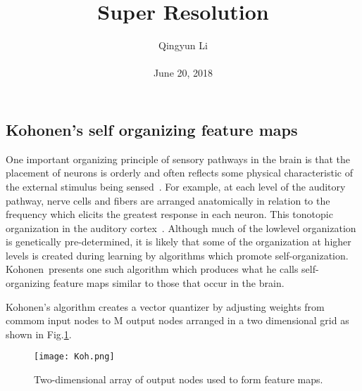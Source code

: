\documentclass[10pt,twocolumn,letterpaper]{article}
\begin{document}
\author{Qingyun Li\\\\
June 20, 2018}        
\title{Super Resolution}

\maketitle

\subsection{Kohonen's self organizing feature maps}
\par One important organizing principle of sensory pathways in the brain is that the placement of neurons is orderly and often reflects some physical characteristic of the external stimulus being sensed~\cite{kandel2000principles}. For example, at each level of the auditory pathway, nerve cells and fibers are arranged anatomically in relation to the frequency which elicits the greatest response in each neuron. This tonotopic organization in the auditory cortex~\cite{kandel2000principles}. Although much of the lowlevel organization is genetically pre-determined, it is likely that some of the organization at higher levels is created during learning by algorithms which promote self-organization. Kohonen~\cite{Kohonen1984Self}presents one such algorithm which produces what he calls self-organizing feature maps similar to those that occur in the brain.
\par Kohonen's algorithm creates a vector quantizer by adjusting weights from commom input nodes to M output nodes arranged in a two dimensional grid as shown in Fig.\ref{17}. 
\begin{figure}[htbp]
 \centering{}
\texttt{[image: Koh.png]}\\
 \caption{Two-dimensional array of output nodes used to form feature maps.}
\label{17}
\end{figure}
 
 
\end{document}

